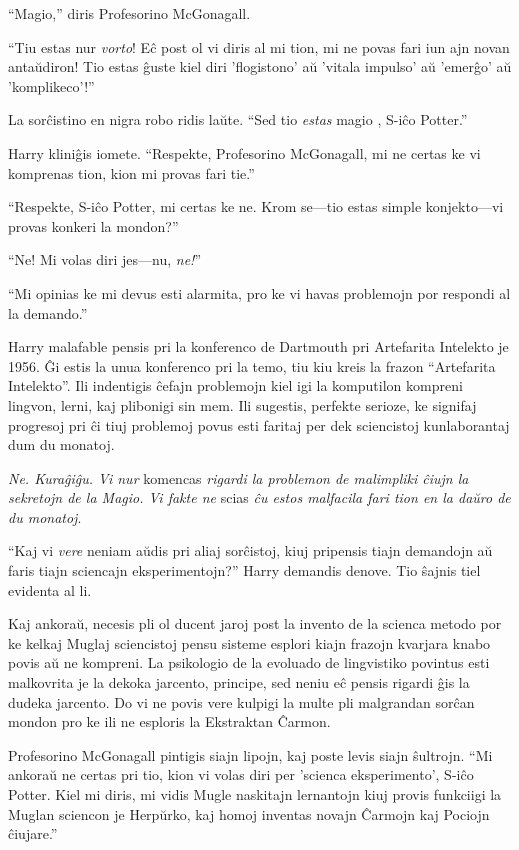 ``Magio,'' diris Profesorino McGonagall.

``Tiu estas nur \emph{vorto}! Eĉ post ol vi diris al mi tion, mi ne
povas fari iun ajn novan antaŭdiron! Tio estas ĝuste kiel diri
'flogistono' aŭ 'vitala impulso' aŭ 'emerĝo' aŭ 'komplikeco'!''

La sorĉistino en nigra robo ridis laŭte. ``Sed tio \emph{estas} magio
, S-iĉo Potter.''

Harry kliniĝis iomete. ``Respekte, Profesorino McGonagall, mi ne
certas ke vi komprenas tion, kion mi provas fari tie.''

``Respekte, S-iĉo Potter, mi certas ke ne. Krom se—tio estas simple
konjekto—vi provas konkeri la mondon?''

``Ne! Mi volas diri jes—nu, \emph{ne!}''

``Mi opinias ke mi devus esti alarmita, pro ke vi havas problemojn por
respondi al la demando.''

Harry malafable pensis pri la konferenco de Dartmouth pri Artefarita
Intelekto je 1956. Ĝi estis la unua konferenco pri la temo, tiu kiu
kreis la frazon ``Artefarita Intelekto''. Ili indentigis ĉefajn
problemojn kiel igi la komputilon kompreni lingvon, lerni, kaj
plibonigi sin mem. Ili sugestis, perfekte serioze, ke signifaj
progresoj pri ĉi tiuj problemoj povus esti faritaj per dek sciencistoj
kunlaborantaj dum du monatoj.

\emph{Ne. Kuraĝiĝu. Vi nur} komencas \emph{rigardi la problemon de
malimpliki ĉiujn la sekretojn de la Magio. Vi fakte ne} scias \emph{ĉu
estos malfacila fari tion en la daŭro de du monatoj}.

``Kaj vi \emph{vere} neniam aŭdis pri aliaj sorĉistoj, kiuj pripensis
tiajn demandojn aŭ faris tiajn sciencajn eksperimentojn?''  Harry
demandis denove. Tio ŝajnis tiel evidenta al li.

Kaj ankoraŭ, necesis pli ol ducent jaroj post la invento de la scienca
metodo por ke kelkaj Muglaj sciencistoj pensu sisteme esplori kiajn
frazojn kvarjara knabo povis aŭ ne kompreni. La psikologio de la
evoluado de lingvistiko povintus esti malkovrita je la dekoka
jarcento, principe, sed neniu eĉ pensis rigardi ĝis la dudeka
jarcento. Do vi ne povis vere kulpigi la multe pli malgrandan sorĉan
mondon pro ke ili ne esploris la Ekstraktan Ĉarmon.

Profesorino McGonagall pintigis siajn lipojn, kaj poste levis siajn
ŝultrojn. ``Mi ankoraŭ ne certas pri tio, kion vi volas diri per
'scienca eksperimento', S-iĉo Potter. Kiel mi diris, mi vidis Mugle
naskitajn lernantojn kiuj provis funkciigi la Muglan sciencon je
Herpŭrko, kaj homoj inventas novajn Ĉarmojn kaj Pociojn ĉiujare.''

